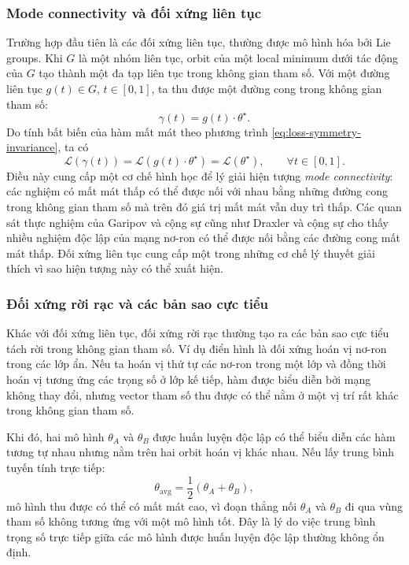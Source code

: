 \subsubsection{Mode connectivity và đối xứng liên tục}

Trường hợp đầu tiên là các đối xứng liên tục, thường được mô hình hóa bởi Lie groups. Khi $G$ là một nhóm liên tục, orbit của một local minimum dưới tác động của $G$ tạo thành một đa tạp liên tục trong không gian tham số. Với một đường liên tục $g(t) \in G$, $t \in [0,1]$, ta thu được một đường cong trong không gian tham số:
\begin{equation}
    \gamma(t) = g(t) \cdot \theta^\star.
    \label{eq:continuous-symmetry-path}
\end{equation}
Do tính bất biến của hàm mất mát theo phương trình \eqref{eq:loss-symmetry-invariance}, ta có
\begin{equation}
    \mathcal{L}(\gamma(t))
    =
    \mathcal{L}(g(t) \cdot \theta^\star)
    =
    \mathcal{L}(\theta^\star),
    \qquad \forall t \in [0,1].
    \label{eq:constant-loss-path}
\end{equation}
Điều này cung cấp một cơ chế hình học để lý giải hiện tượng \textit{mode connectivity}: các nghiệm có mất mát thấp có thể được nối với nhau bằng những đường cong trong không gian tham số mà trên đó giá trị mất mát vẫn duy trì thấp. Các quan sát thực nghiệm của Garipov và cộng sự \cite{garipov2018loss} cũng như Draxler và cộng sự \cite{draxler2018essentially} cho thấy nhiều nghiệm độc lập của mạng nơ-ron có thể được nối bằng các đường cong mất mát thấp. Đối xứng liên tục cung cấp một trong những cơ chế lý thuyết giải thích vì sao hiện tượng này có thể xuất hiện.

\subsubsection{Đối xứng rời rạc và các bản sao cực tiểu}

Khác với đối xứng liên tục, đối xứng rời rạc thường tạo ra các bản sao cực tiểu tách rời trong không gian tham số. Ví dụ điển hình là đối xứng hoán vị nơ-ron trong các lớp ẩn. Nếu ta hoán vị thứ tự các nơ-ron trong một lớp và đồng thời hoán vị tương ứng các trọng số ở lớp kế tiếp, hàm được biểu diễn bởi mạng không thay đổi, nhưng vector tham số thu được có thể nằm ở một vị trí rất khác trong không gian tham số.

Khi đó, hai mô hình $\theta_A$ và $\theta_B$ được huấn luyện độc lập có thể biểu diễn các hàm tương tự nhau nhưng nằm trên hai orbit hoán vị khác nhau. Nếu lấy trung bình tuyến tính trực tiếp:
\begin{equation}
    \theta_{\mathrm{avg}}
    =
    \frac{1}{2}(\theta_A + \theta_B),
    \label{eq:naive-weight-averaging}
\end{equation}
mô hình thu được có thể có mất mát cao, vì đoạn thẳng nối $\theta_A$ và $\theta_B$ đi qua vùng tham số không tương ứng với một mô hình tốt. Đây là lý do việc trung bình trọng số trực tiếp giữa các mô hình được huấn luyện độc lập thường không ổn định.

